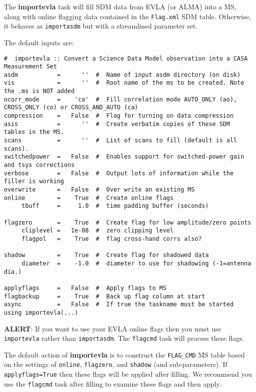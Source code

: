 The {\bf importevla} task will fill SDM data from EVLA (or ALMA) into
a MS, along with online flagging data contained in the {\tt Flag.xml}
SDM table.  Otherwise, it behaves as {\tt importasdm} but with a
streamlined parameter set.

The default inputs are:

\small
\begin{verbatim}
#  importevla :: Convert a Science Data Model observation into a CASA Measurement Set
asdm           =      ''  #  Name of input asdm directory (on disk)
vis            =      ''  #  Root name of the ms to be created. Note the .ms is NOT added
ocorr_mode     =    'ca'  #  Fill correlation mode AUTO_ONLY (ao), CROSS_ONLY (co) or CROSS_AND_AUTO (ca)
compression    =   False  #  Flag for turning on data compression
asis           =      ''  #  Create verbatim copies of these SDM tables in the MS.
scans          =      ''  #  List of scans to fill (default is all scans).
switchedpower  =   False  #  Enables support for switched-power gain and tsys corrections
verbose        =   False  #  Output lots of information while the filler is working
overwrite      =   False  #  Over write an existing MS
online         =    True  #  Create online flags
     tbuff     =     1.0  #  time padding buffer (seconds)

flagzero       =    True  #  Create flag for low amplitude/zero points
     cliplevel =   1e-08  #  zero clipping level
     flagpol   =    True  #  flag cross-hand corrs also?

shadow         =    True  #  Create flag for shadowed data
     diameter  =    -1.0  #  diameter to use for shadowing (-1=antenna dia.)

applyflags     =   False  #  Apply flags to MS
flagbackup     =    True  #  Back up flag column at start
async          =   False  #  If true the taskname must be started using importevla(...)
\end{verbatim}
\normalsize

{\bf ALERT}: If you want to use your EVLA online flags then you must
use {\tt importevla} rather than {\tt importasdm}.  The {\tt flagcmd} 
task will process these flags.

The default action of {\bf importevla} is to construct the {\tt FLAG\_CMD} 
MS table based on the settings of {\tt online}, {\tt flagzero}, and
{\tt shadow} (and sub-parameters).  If {\tt applyflags=True} then these
flags will be applied after filling.  We recommend you use the {\tt flagcmd}
task after filling to examine these flags and then apply.

